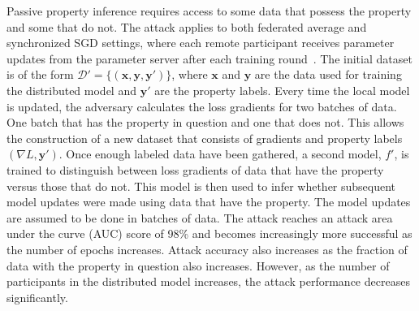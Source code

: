 Passive property inference requires access to some data that possess the property and some that do not. The attack applies to both federated average and synchronized SGD settings, where each remote participant receives parameter updates from the parameter server after each training round~. The initial dataset is of the form $\mathcal{D'}=\{(\mathbf{x}, \mathbf{y}, \mathbf{y'})\}$, where $\mathbf{x}$ and $\mathbf{y}$  are the data used for training the distributed model and $\mathbf{y}'$ are the property labels. Every time the local model is updated, the adversary calculates the loss gradients for two batches of data. One batch that has the property in question and one that does not. This allows the construction of a new dataset that consists of gradients and property labels $(\nabla L, \mathbf{y}')$. Once enough labeled data have been gathered, a second model, $f'$, is trained to distinguish between loss gradients of data that have the property versus those that do not. This model is then used to infer whether subsequent model updates were made using data that have the property. The model updates are assumed to be done in batches of data. The attack reaches an attack area under the curve (AUC) score of 98\% and becomes increasingly more successful as the number of epochs increases. Attack accuracy also increases as the fraction of data with the property in question also increases. However, as the number of participants in the distributed model increases, the attack performance decreases significantly.

